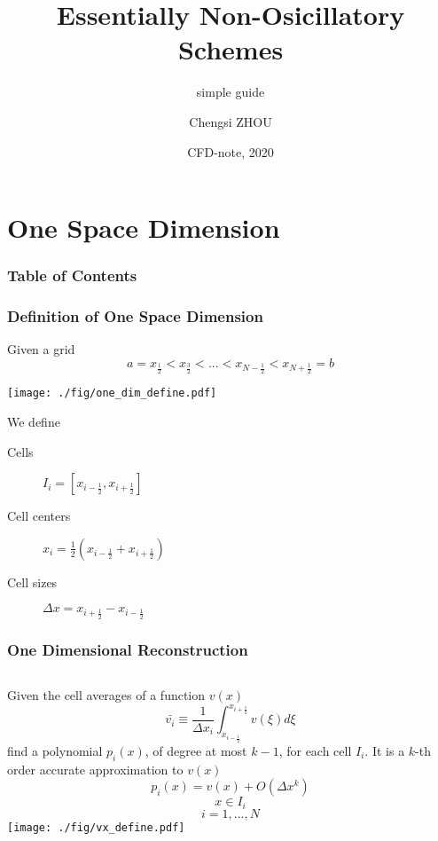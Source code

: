\documentclass[MathSerif]{beamer}
\title[CFD-note] %
{Essentially Non-Osicillatory Schemes}
\subtitle{simple guide}
\author[Chengsi ZHOU] %
{Chengsi ZHOU}
\date[Feb 2020] %
{CFD-note, 2020}
\begin{document}
\section[Definition]{One Space Dimension}
\begin{frame}
	\frametitle{Table of Contents}
	\tableofcontents[]
\end{frame}

\begin{frame}
    \frametitle{Definition of One Space Dimension}
	Given a grid 
	\[ a = x_{\frac{1}{2}} < x_{\frac{3}{2}} < ... < x_{N-\frac{1}{2}} < x_{N + \frac{1}{2}} = b \]
\begin{center}
	\texttt{[image: ./fig/one\_dim\_define.pdf]}
\end{center}
	We define 
\begin{description}
	\item[Cells] \( I_i = [x_{i-\frac{1}{2}}, x_{i+\frac{1}{2}}]\)
	\item[Cell centers] \( x_i = \frac{1}{2} (x_{i-\frac{1}{2}} + x_{i+\frac{1}{2}})\)
	\item[Cell sizes] \( \Delta x = x_{i+\frac{1}{2}} - x_{i-\frac{1}{2}}\)
\end{description}
\end{frame}

\begin{frame}

\frametitle{One Dimensional Reconstruction}

\begin{columns}[T] %
    Given the cell averages of a function \( v(x) \) 
    \[ \bar{v_i} \equiv \frac{1}{\Delta x_i}  \int_{x_{i-\frac{1}{2}}}^{x_{i+\frac{1}{2}}} v(\xi) d \xi\]
    find a polynomial $p_i(x)$, of degree at most $k-1$, for each cell $I_i$. It is a $k$-th order accurate approximation to $v(x)$
    \[p_i(x) = v(x) + O(\Delta x^k)\]
    \[x \in I_i\]
    \[i=1,...,N\]
    \texttt{[image: ./fig/vx\_define.pdf]}
    \end{columns}

\end{frame}
  

  
\end{document}

